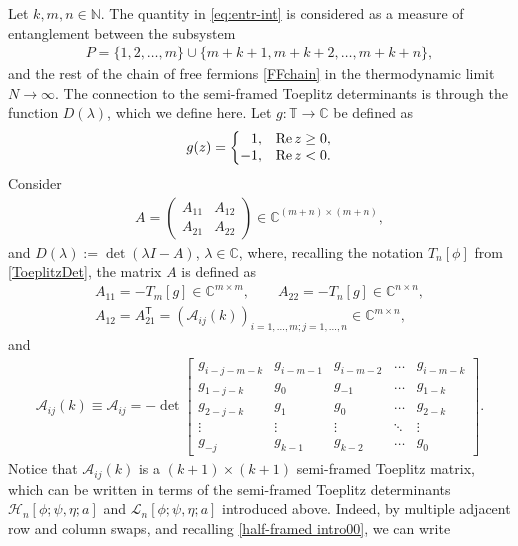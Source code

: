 \documentclass[pdftex]{sigma}
\numberwithin{equation}{section}
\newcommand{\C}{{\mathbb C}}
\newcommand{\N}{{\mathbb N}}
\newcommand{\T}{{\mathbb T}}
\newcommand{\la}{\lambda}
\begin{document}
	Let $k,m,n\in\N$. The quantity in \eqref{eq:entr-int} is considered as a measure of entanglement between the subsystem
	\begin{gather*}%
		P = \{1,2,\dots, m\}\cup\{m+k+1,m+k+2,\dots,m+k+n\},
	\end{gather*}
	and the rest of the chain of free fermions \eqref{FFchain} in the thermodynamic limit $N \to \infty$. The connection to the semi-framed Toeplitz determinants is through the function $D(\la)$, which we define here. Let $g\colon \T \to \C$ be defined as
	\begin{equation}\label{entanglement symbol}
		g(z) = \left\{ \begin{matrix}
			\hphantom{-}1, & \operatorname{Re} z \geq 0, \\
			-1, & \operatorname{Re} z < 0.
		\end{matrix} \right.
	\end{equation}
	Consider
	\begin{gather*}%
		A = \left(\begin{matrix}
			A_{11} & A_{12} \\
			A_{21} & A_{22}
		\end{matrix}\right)\in\C^{(m+n)\times(m+n)},
	\end{gather*}
 and $D(\lambda) := \det(\lambda I - A)$, $\lambda\in\C$, where, recalling the notation $T_n[\phi]$ from \eqref{ToeplitzDet}, the matrix $A$ is defined as
	\begin{gather*}%
		A_{11} = -T_m[g]\in\C^{m\times m}, \qquad A_{22} = -T_n[g]\in\C^{n\times n}, \\ A_{12} = A_{21}^{\mathsf T} = (\mathscr{A}_{ij}(k))_{i=1,\dots, m; j=1,\dots, n}\in\C^{m\times n},
	\end{gather*}
	and
	\begin{gather*}%
		\mathscr{A}_{ij}(k) \equiv \mathscr{A}_{ij} = -\det \begin{bmatrix}
			g_{i-j-m-k} & g_{i-m-1} & g_{i-m-2} & \dots & g_{i-m-k} \\
			g_{1-j-k} & g_0 & g_{-1} & \dots & g_{1-k} \\
			g_{2-j-k} & g_1 & g_0 & \dots & g_{2-k} \\
			\vdots & \vdots & \vdots & \ddots & \vdots \\
			g_{-j} & g_{k-1} & g_{k-2} & \dots & g_0
		\end{bmatrix}.
	\end{gather*}
	Notice that $ \mathscr{A}_{ij}(k)$ is a $(k+1)\times(k+1)$ semi-framed Toeplitz matrix, which can be written in terms of the semi-framed Toeplitz determinants $\mathscr{H}_n[\phi;\psi,\eta;a]$ and $\mathscr{L}_n[\phi;\psi,\eta;a]$ introduced above. Indeed, by multiple adjacent row and column swaps, and recalling \eqref{half-framed intro00}, we can write
\end{document}
